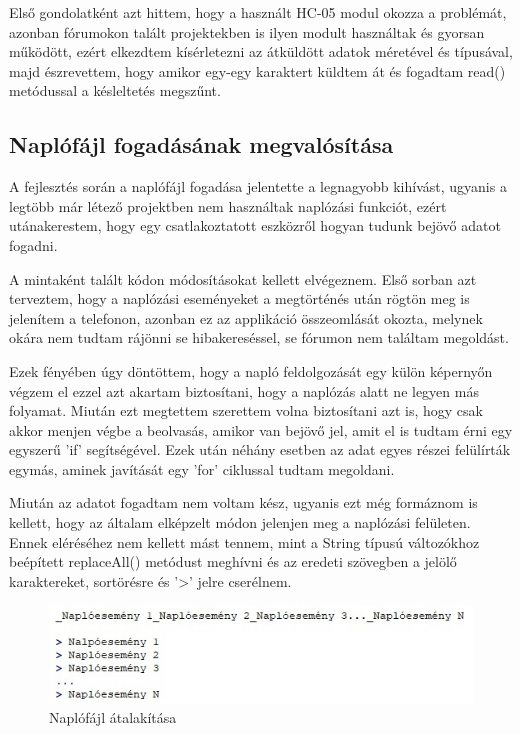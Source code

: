 \documentclass[]{thesis-ekf}
\theoremstyle{definition}
\begin{document}
Első gondolatként azt hittem, hogy a használt HC-05 modul okozza a problémát, azonban fórumokon talált projektekben is ilyen modult használtak és gyorsan működött, ezért elkezdtem kísérletezni az átküldött adatok méretével és típusával, majd észrevettem, hogy amikor egy-egy karaktert küldtem át és fogadtam read() metódussal a késleltetés megszűnt.
\subsection{Naplófájl fogadásának megvalósítása}\label{log_fogadás}
A fejlesztés során a naplófájl fogadása jelentette a legnagyobb kihívást, ugyanis a legtöbb már létező projektben nem használtak naplózási funkciót, ezért utánakerestem, hogy egy csatlakoztatott eszközről hogyan tudunk bejövő adatot fogadni\cite{Data_Recieve}.

A mintaként talált kódon módosításokat kellett elvégeznem. Első sorban azt terveztem, hogy a naplózási eseményeket a megtörténés után rögtön meg is jelenítem a telefonon, azonban ez az applikáció összeomlását okozta, melynek okára nem tudtam rájönni se hibakereséssel, se fórumon nem találtam megoldást.

Ezek fényében úgy döntöttem, hogy a napló feldolgozását egy külön képernyőn végzem el ezzel azt akartam biztosítani, hogy a naplózás alatt ne legyen más folyamat. Miután ezt megtettem szerettem volna biztosítani azt is, hogy csak akkor menjen végbe a beolvasás, amikor van bejövő jel, amit el is tudtam érni egy egyszerű 'if' segítségével. Ezek után néhány esetben az adat egyes részei felülírták egymás, aminek javítását egy 'for' ciklussal tudtam megoldani.

Miután az adatot fogadtam nem voltam kész, ugyanis ezt még formáznom is kellett, hogy az általam elképzelt módon jelenjen meg a naplózási felületen. Ennek eléréséhez nem kellett mást tennem, mint a String típusú változókhoz beépített replaceAll() metódust meghívni és az eredeti szövegben a jelölő karaktereket, sortörésre és '>' jelre cserélnem.
\begin{figure}[h]
	\centering
	\includegraphics[width=0.8\columnwidth]{images/log_transform}
	\caption{Naplófájl átalakítása}
	\label{log_transform}
\end{figure}
\end{document}
